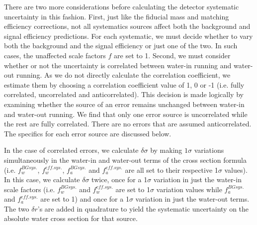 There are two more considerations before calculating the detector systematic uncertainty in this fashion. First, just like the fiducial mass and matching efficiency corrections, not all systematics sources affect both the background and signal efficiency predictions. For each systematic, we must decide whether to vary both the background and the signal efficiency or just one of the two. In such cases, the unaffected scale factors $f$ are set to 1. Second, we must consider whether or not the uncertainty is correlated between water-in running and water-out running. As we do not directly calculate the correlation coefficient, we estimate them by choosing a correlation coefficient value of 1, 0 or -1 (i.e. fully correlated, uncorrelated and anticorrelated). This decision is made logically by examining whether the source of an error remains unchanged between water-in and water-out running. We find that only one error source is uncorrelated while the rest are fully correlated. There are no errors that are assumed anticorrelated. The specifics for each error source are discussed below. 

In the case of correlated errors, we calculate $\delta\sigma$ by making $1\sigma$ variations simultaneously in the water-in and water-out terms of the cross section formula (i.e. $f_w^{BG sys.}$, $f_w^{eff. sys.}$, $f_a^{BG sys.}$ and $f_a^{eff. sys.}$ are all set to their respective 1$\sigma$ values). In this case, we calculate $\delta\sigma$ twice, once for a 1$\sigma$ variation in just the water-in scale factors (i.e.  $f_w^{BG sys.}$ and $f_w^{eff. sys.}$ are set to 1$\sigma$ variation values while $f_a^{BG sys.}$ and $f_a^{eff. sys.}$ are set to 1) and once for a 1$\sigma$ variation in just the water-out terms. The two $\delta r$'s are added in quadrature to yield the systematic uncertainty on the absolute water cross section for that source.

